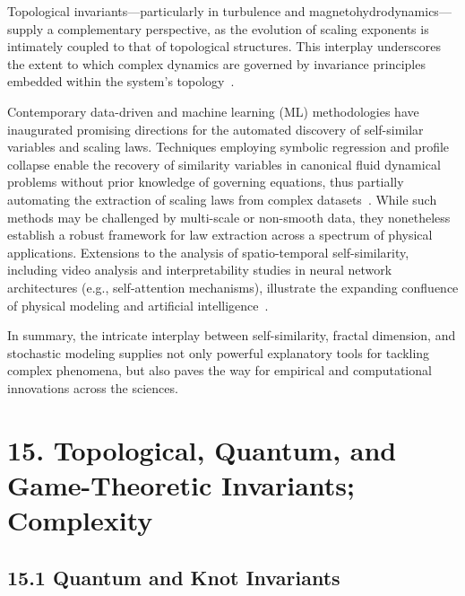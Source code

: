 \documentclass[11pt]{article}
\begin{document}
Topological invariants—particularly in turbulence and magnetohydrodynamics—supply a complementary perspective, as the evolution of scaling exponents is intimately coupled to that of topological structures. This interplay underscores the extent to which complex dynamics are governed by invariance principles embedded within the system's topology~\cite{ref60}.

Contemporary data-driven and machine learning (ML) methodologies have inaugurated promising directions for the automated discovery of self-similar variables and scaling laws. Techniques employing symbolic regression and profile collapse enable the recovery of similarity variables in canonical fluid dynamical problems without prior knowledge of governing equations, thus partially automating the extraction of scaling laws from complex datasets~\cite{ref65}. While such methods may be challenged by multi-scale or non-smooth data, they nonetheless establish a robust framework for law extraction across a spectrum of physical applications. Extensions to the analysis of spatio-temporal self-similarity, including video analysis and interpretability studies in neural network architectures (e.g., self-attention mechanisms), illustrate the expanding confluence of physical modeling and artificial intelligence~\cite{ref39}.

\vspace{1em}

In summary, the intricate interplay between self-similarity, fractal dimension, and stochastic modeling supplies not only powerful explanatory tools for tackling complex phenomena, but also paves the way for empirical and computational innovations across the sciences.

\section{15. Topological, Quantum, and Game-Theoretic Invariants; Complexity}

\subsection{15.1 Quantum and Knot Invariants}
\end{document}
